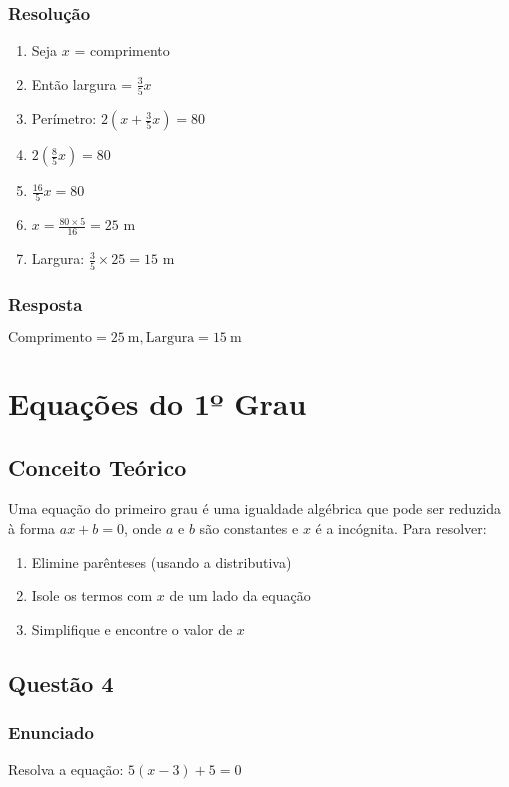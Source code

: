 \documentclass[11pt]{article}
\begin{document}
\subsubsection*{Resolução}
\begin{enumerate}
\item Seja $x$ = comprimento
\item Então largura = $\frac{3}{5}x$
\item Perímetro: $2(x + \frac{3}{5}x) = 80$
\item $2(\frac{8}{5}x) = 80$
\item $\frac{16}{5}x = 80$
\item $x = \frac{80 \times 5}{16} = 25$ m
\item Largura: $\frac{3}{5} \times 25 = 15$ m
\end{enumerate}

\subsubsection*{Resposta}
$\boxed{\text{Comprimento} = 25\ \text{m}, \text{Largura} = 15\ \text{m}}$

\section{Equações do 1º Grau}

\subsection{Conceito Teórico}
Uma equação do primeiro grau é uma igualdade algébrica que pode ser reduzida à forma $ax + b = 0$, onde $a$ e $b$ são constantes e $x$ é a incógnita. Para resolver:
\begin{enumerate}
\item Elimine parênteses (usando a distributiva)
\item Isole os termos com $x$ de um lado da equação
\item Simplifique e encontre o valor de $x$
\end{enumerate}

\subsection{Questão 4}
\subsubsection*{Enunciado}
Resolva a equação: $5(x - 3) + 5 = 0$
\end{document}
